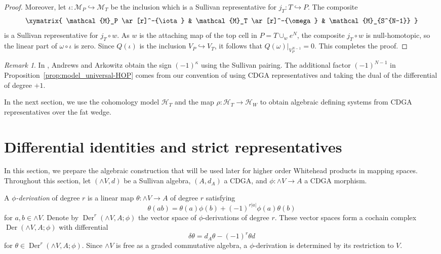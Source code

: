 \documentclass[a4paper,10pt]{amsart}
\theoremstyle{definition}
\theoremstyle{remark}
\newtheorem{remark}[thm]{Remark}
\newcommand{\Der}{\operatorname{Der}}
\numberwithin{equation}{section}
\begin{document}
\begin{proof}
Moreover, let $\iota : \mathcal{M}_P \hookrightarrow \mathcal{M}_T$ be the inclusion which is a Sullivan representative for $j_T : T\hookrightarrow P$. 
The composite
\[
\xymatrix{
\mathcal{M}_P   \ar[r]^-{\iota}
&
\mathcal{M}_T \ar[r]^-{\omega}
&
\mathcal{M}_{S^{N-1}}
}
\]
is a Sullivan representative for $j_T\circ w$.
As $w$ is the attaching map of the top cell in $P=T\cup_w e^N$, the composite $j_T\circ w$ is null-homotopic, so the linear part of $\omega\circ\iota$ is zero.
Since $Q(\iota)$ is the inclusion $V_P\hookrightarrow V_T$, it follows that $Q(\omega)|_{V_P^{N-1}}=0$.
This completes the proof.
\end{proof}



\begin{remark}\label{rem:sign}
In \cite[Proposition~4.7]{AA1978}, Andrews and Arkowitz obtain the sign
$(-1)^\kappa$ using the Sullivan pairing. The additional factor
$(-1)^{N-1}$ in Proposition~\ref{prop:model_universal-HOP} comes from our
convention of using CDGA representatives and taking the dual of the
differential of degree $+1$.
\end{remark}

In the next section, we use the cohomology model $\mathcal H_T$ and the map
$\rho:\mathcal H_T\to\mathcal H_W$ to obtain algebraic defining systems from
CDGA representatives over the fat wedge.






\section{Differential identities and strict representatives}

In this section, we prepare the algebraic construction that will be used later
for higher order Whitehead products in mapping spaces. Throughout this section, let
$(\wedge V,d)$ be a Sullivan algebra, $(A,d_A)$ a CDGA, and
$
\phi:\wedge V\to A
$
a CDGA morphism.

A \emph{$\phi$-derivation} of degree $r$
is a linear map $\theta:\wedge V\to A$ of degree $r$ satisfying
\[
        \theta(ab)
        =
        \theta(a)\phi(b)+(-1)^{r|a|}\phi(a)\theta(b)
\]
for $a,b\in \wedge V$.
Denote by $\Der^r(\wedge V,A;\phi)$ the vector space of
$\phi$-derivations of degree $r$. These vector spaces form a cochain complex
$\Der(\wedge V,A;\phi)$ with differential
\[
        \delta\theta
        =
        d_A\theta-(-1)^r \theta d
\]
for $\theta\in \Der^r (\wedge V,A;\phi)$.
Since $\wedge V$ is free as a graded commutative algebra, a $\phi$-derivation
is determined by its restriction to $V$.
\end{document}
